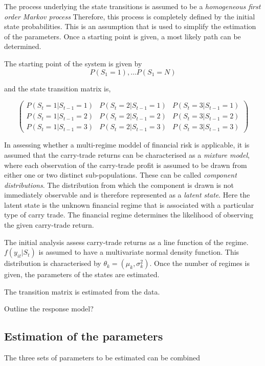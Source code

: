 \documentclass[12pt, a4paper, oneside]{article} %
\begin{document}
The process underlying the state transitions is assumed to be a \emph{homogeneous first order Markov process}  Therefore, this process is completely defined by the initial state probabilities. This is an assumption that is used to simplify the estimation of the parameters. Once a starting point is given, a most likely path can be determined. 


The starting point of the system is given by
\begin{equation*}
P(S_1 = 1), \dots P(S_1 = N)
\end{equation*}

and the state transition matrix is, 

\begin{equation*}
\begin{pmatrix}
P(S_t = 1|S_{t-1}=1) & P(S_t = 2|S_{t-1}=1) & P(S_t = 3|S_{t-1}=1)\\
P(S_t = 1|S_{t-1}=2) & P(S_t = 2|S_{t-1}=2) & P(S_t = 3|S_{t-1}=2)\\
P(S_t = 1|S_{t-1}=3) & P(S_t = 2|S_{t-1}=3) & P(S_t = 3|S_{t-1}=3)
\end{pmatrix}
\end{equation*}



In assessing whether a multi-regime moddel of financial risk is applicable, it is assumed that the carry-trade returns can be characterised as a \emph{mixture model}, where each observation of the carry-trade profit is assumed to be drawn from either one or two distinct sub-populations.  These can be called \emph{component distributions}.  The distribution from which the component is drawn is not immediately observable and is therefore represented as a \emph{latent state}.  Here the latent state is the unknown financial regime that is associated with a particular type of carry trade.  The financial regime determines the likelihood of observing the given carry-trade return. 


The initial analysis assess carry-trade returns as a line function of the regime. 
$f(y_{it}|S_t)$ is assumed to have a multivariate normal density function. This distribution is characterised by $\theta_k = (\mu_k, \sigma_k^2)$. Once the number of regimes is given, the parameters of the states are estimated.  

The transition matrix is estimated from the data. 


Outline the response model?

\subsection{Estimation of the parameters}
The three sets of parameters to be estimated can be combined 
\end{document}
